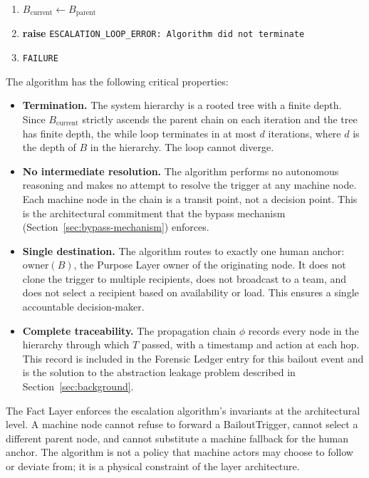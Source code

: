 \begin{enumerate}[noitemsep]
\begin{enumerate}[noitemsep][1]
\item $B_{\text{current}} \leftarrow B_{\text{parent}}$
\EndWhile

\item \textbf{raise} \texttt{ESCALATION\_LOOP\_ERROR: Algorithm did not terminate}
\item \Return \texttt{FAILURE}
\EndFunction

\end{enumerate}
\end{enumerate}

\bigskip

The algorithm has the following critical properties:

\begin{itemize}\setlength\itemsep{0.25em}
\item \textbf{Termination.} The system hierarchy is a rooted tree with a finite depth. Since $B_{\text{current}}$ strictly ascends the parent chain on each iteration and the tree has finite depth, the while loop terminates in at most $d$ iterations, where $d$ is the depth of $B$ in the hierarchy. The loop cannot diverge.
\item \textbf{No intermediate resolution.} The algorithm performs no autonomous reasoning and makes no attempt to resolve the trigger at any machine node. Each machine node in the chain is a transit point, not a decision point. This is the architectural commitment that the bypass mechanism (Section~\ref{sec:bypass-mechanism}) enforces.
\item \textbf{Single destination.} The algorithm routes to exactly one human anchor: $\text{owner}(B)$, the Purpose Layer owner of the originating node. It does not clone the trigger to multiple recipients, does not broadcast to a team, and does not select a recipient based on availability or load. This ensures a single accountable decision-maker.
\item \textbf{Complete traceability.} The propagation chain $\phi$ records every node in the hierarchy through which $T$ passed, with a timestamp and action at each hop. This record is included in the Forensic Ledger entry for this bailout event and is the solution to the abstraction leakage problem described in Section~\ref{sec:background}.
\end{itemize}

The Fact Layer enforces the escalation algorithm's invariants at the architectural level. A machine node cannot refuse to forward a BailoutTrigger, cannot select a different parent node, and cannot substitute a machine fallback for the human anchor. The algorithm is not a policy that machine actors may choose to follow or deviate from; it is a physical constraint of the layer architecture.

